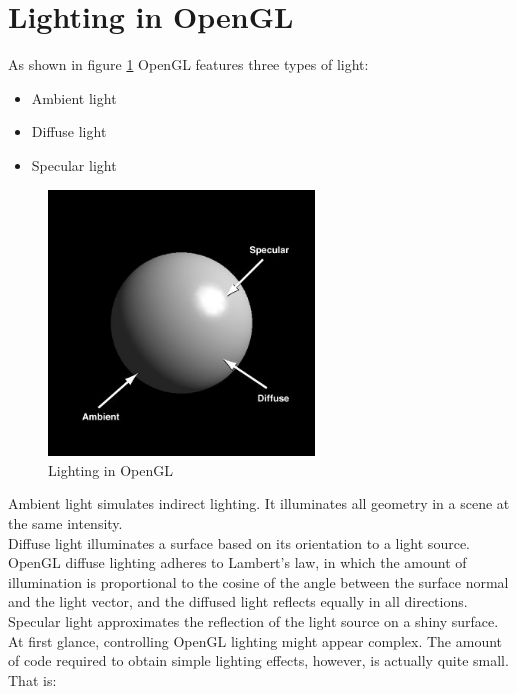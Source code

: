 \section{Lighting in OpenGL}
\label{opengl:light}
\lstset{language=C++}

As shown in figure \ref{fig:lighting} OpenGL features three types of light:

\begin{itemize}
  \item Ambient light
  \item Diffuse light
  \item Specular light
\end{itemize}

\begin{figure}[!h]
  \begin{center}
    \includegraphics[width=200pt]{img/light}
    \caption{Lighting in OpenGL}
    \label{fig:lighting}
  \end{center}
\end{figure}

Ambient light simulates indirect lighting. It illuminates all 
geometry in a scene at the same intensity.
\\
Diffuse light illuminates a surface based on its orientation 
to a light source. OpenGL diffuse lighting adheres to 
Lambert's law, in which the amount of illumination is proportional 
to the cosine of the angle between the surface normal and the 
light vector, and the diffused light reflects equally in 
all directions.
\\
Specular light approximates the reflection of the light source on 
a shiny surface.
\\
At first glance, controlling OpenGL lighting might appear complex. 
The amount of code required to obtain simple lighting effects, 
however, is actually quite small. That is:

